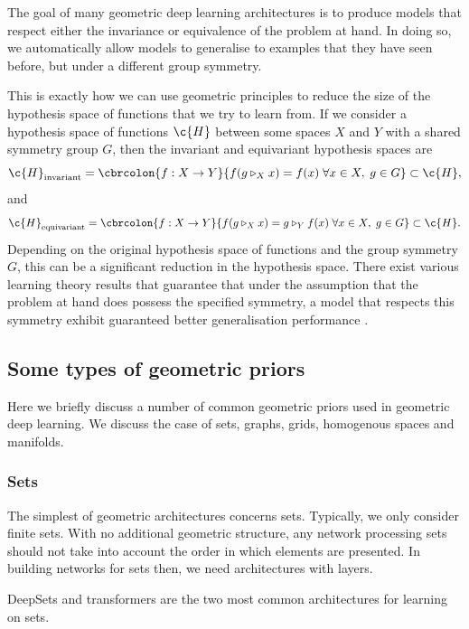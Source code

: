 The goal of many geometric deep learning architectures is to produce models that respect either the invariance or equivalence of the problem at hand.
In doing so, we automatically allow models to generalise to examples that they have seen before, but under a different group symmetry.

This is exactly how we can use geometric principles to reduce the size of the hypothesis space of functions that we try to learn from.
If we consider a hypothesis space of functions \(\c{H}\) between some spaces \(X\) and \(Y\) with a shared symmetry group \(G\), then the invariant and equivariant hypothesis spaces are 
\[\c{H}_{\text{invariant}} = \cbrcolon{f: X\to Y}{f(g\triangleright_X x) = f(x) \; \forall x\in X, \; g\in G} \subset \c{H}, \]
and 
\[\c{H}_{\text{equivariant}} = \cbrcolon{f: X\to Y}{f(g\triangleright_X x) = g \triangleright_Y f(x) \; \forall x\in X, \; g\in G} \subset \c{H}.\]
Depending on the original hypothesis space of functions and the group symmetry \(G\), this can be a significant reduction in the hypothesis space.
There exist various learning theory \cite{vapniknature,hastie2009elements} results that guarantee that under the assumption that the problem at hand does possess the specified symmetry, a model that respects this symmetry exhibit guaranteed better generalisation performance \cite{elesedy2021provably,elesedy2021provably2,lyle2020benefits,NEURIPS2022_257b9a6a}.

\subsection{Some types of geometric priors}
Here we briefly discuss a number of common geometric priors used in geometric deep learning.
We discuss the case of sets, graphs, grids, homogenous spaces and manifolds.

\subsubsection{Sets}

The simplest of geometric architectures concerns sets.
Typically, we only consider finite sets.
With no additional geometric structure, any network processing sets should not take into account the order in which elements are presented.
In building networks for sets then, we need architectures with  layers.

DeepSets \cite{DeepSets} and transformers \cite{vaswani2017attention} are the two most common architectures for learning on sets.

